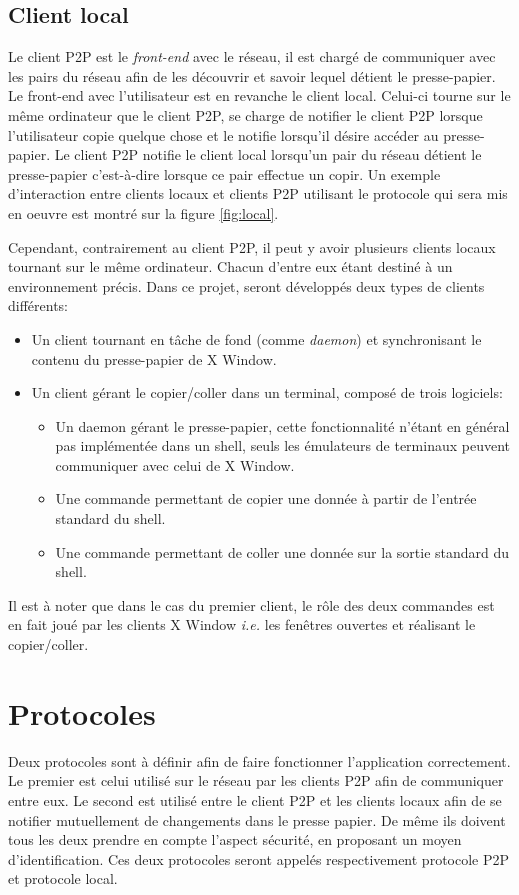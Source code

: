 \subsection{Client local}
Le client P2P est le \emph{front-end} avec le réseau, il est chargé
de communiquer avec les pairs du réseau afin de les découvrir et savoir
lequel détient le presse-papier. Le front-end avec l'utilisateur
est en revanche le client local. Celui-ci tourne sur le même ordinateur
que le client P2P, se charge de notifier le client P2P lorsque
l'utilisateur copie quelque chose et le notifie lorsqu'il désire
accéder au presse-papier. Le client P2P notifie le client local
lorsqu'un pair du réseau détient le presse-papier c'est-à-dire lorsque ce
pair effectue un copir.
Un exemple d'interaction entre clients locaux et clients P2P utilisant
le protocole qui sera mis en oeuvre est montré sur la figure \ref{fig:local}.

Cependant, contrairement au client P2P, il peut y avoir plusieurs clients
locaux tournant sur le même ordinateur. Chacun d'entre eux étant destiné
à un environnement précis. Dans ce projet, seront développés deux types
de clients différents:
\begin{itemize}
\item Un client tournant en tâche de fond (comme \emph{daemon}) et
  synchronisant le contenu du presse-papier de X Window.
\item Un client gérant le copier/coller dans un terminal, composé de trois
  logiciels:
  \begin{itemize}
  \item Un daemon gérant le presse-papier, cette fonctionnalité n'étant en
    général pas implémentée dans un shell, seuls les émulateurs de terminaux
    peuvent communiquer avec celui de X Window.
  \item Une commande permettant de copier une donnée à partir de l'entrée
    standard du shell.
  \item Une commande permettant de coller une donnée sur la sortie standard
    du shell.
  \end{itemize}
\end{itemize}
Il est à noter que dans le cas du premier client, le rôle des deux commandes
est en fait joué par les clients X Window \emph{i.e.} les fenêtres ouvertes
et réalisant le copier/coller.

\section{Protocoles}
Deux protocoles sont à définir afin de faire fonctionner l'application
correctement. Le premier est celui utilisé sur le réseau par les clients
P2P afin de communiquer entre eux. Le second est utilisé entre le client
P2P et les clients locaux afin de se notifier mutuellement de changements
dans le presse papier. De même ils doivent tous les deux prendre en compte
l'aspect sécurité, en proposant un moyen d'identification.
Ces deux protocoles seront appelés respectivement protocole P2P et protocole
local.

